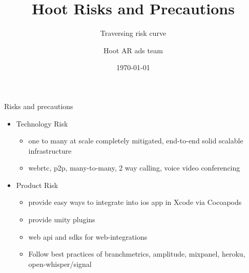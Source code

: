 \documentclass[12pt]{beamer}
\title{ Hoot Risks and Precautions}
\subtitle{Traversing risk curve}
\date{\today}
\author{Hoot AR ads team}
\institute{Hoot Live inc., a Delaware C-corp}
\begin{document}
\maketitle



\begin{frame}[fragile]{Risks and precautions}
 \begin{itemize}[<+-| alert@+>]%
	 
\item[ ]{Technology Risk }
\begin{itemize}[<+-| alert@+>]
\item one to many at scale completely mitigated, end-to-end solid scalable infrastructure
\item webrtc, p2p, many-to-many, 2 way calling, voice video conferencing
\end{itemize}
\item[ ]{Product Risk}
\begin{itemize}[<+-| alert@+>]
\item provide easy ways to integrate into ios app in Xcode via Cocoapods
\item provide unity plugins
\item web api and sdks for web-integrations
\item Follow best practices of branchmetrics, amplitude, mixpanel, heroku, open-whisper/signal
\end{itemize}


\end{itemize}

\end{frame}
\end{document}
